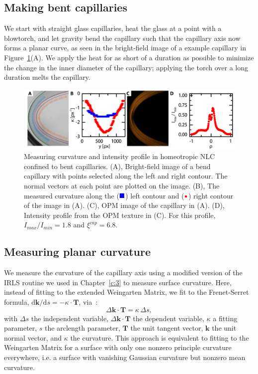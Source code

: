 \subsection{Making bent capillaries}
We start with straight glass capillaries, heat the glass at a point with a blowtorch, and let gravity bend the capillary such that the capillary axis now forms a planar curve, as seen in the bright-field image of a example capillary in Figure~\ref{f:4-BentCaps}(A).
We apply the heat for as short of a duration as possible to minimize the change in the inner diameter of the capillary; applying the torch over a long duration melts the capillary.
\begin{figure}
  \centering
  \includegraphics{figures/C4/Ch4-Figs_BentCaps.png}
  \caption{Measuring curvature and intensity profile in homeotropic NLC confined to bent capillaries.
  (A), Bright-field image of a bend capillary with points selected along the left and right contour.
  The normal vectors at each point are plotted on the image.
  (B), The measured curvature along the (${\color{blue} \blacksquare}$) left contour and (${\color{red} \bullet}$) right contour of the image in (A).
  (C), OPM image of the capillary in (A).
  (D), Intensity profile from the OPM texture in (C).
  For this profile, $I_{max}/I_{min} = 1.8$ and $\xi^{cap} = 6.8$.}\label{f:4-BentCaps}
\end{figure}

\subsection{Measuring planar curvature}
We measure the curvature of the capillary axis using a modified version of the IRLS routine we used in Chapter~\ref{c:3} to measure surface curvature.
Here, instead of fitting to the extended Weingarten Matrix, we fit to the Frenet-Serret formula, $\textrm{d}\mathbf{k}/\textrm{d}s = -\kappa \cdot \mathbf{T}$, via~\cite{RN23}:
\begin{equation}
  \Delta \mathbf{k} \cdot \mathbf{T} = \kappa \, \Delta s,\label{e:4-FSfit}
\end{equation}
with $\Delta s$ the independent variable, $\Delta \mathbf{k} \cdot \mathbf{T}$ the dependent variable, $\kappa$ a fitting parameter, $s$ the arclength parameter, $\mathbf{T}$ the unit tangent vector, $\mathbf{k}$ the unit normal vector, and $\kappa$ the curvature.
This approach is equivalent to fitting to the Weingarten Matrix for a surface with only one nonzero principle curvature everywhere, i.e. a surface with vanishing Gaussian curvature but nonzero mean curvature.

